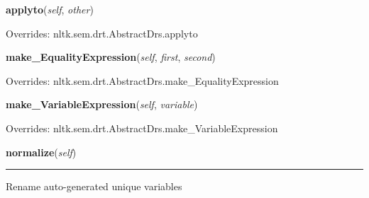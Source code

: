 \hspace{.8\funcindent}\begin{boxedminipage}{\funcwidth}

    \raggedright \textbf{applyto}(\textit{self}, \textit{other})

\setlength{\parskip}{2ex}
\setlength{\parskip}{1ex}
      Overrides: nltk.sem.drt.AbstractDrs.applyto

    \end{boxedminipage}

    \vspace{0.5ex}

\hspace{.8\funcindent}\begin{boxedminipage}{\funcwidth}

    \raggedright \textbf{make\_EqualityExpression}(\textit{self}, \textit{first}, \textit{second})

\setlength{\parskip}{2ex}
\setlength{\parskip}{1ex}
      Overrides: nltk.sem.drt.AbstractDrs.make\_EqualityExpression

    \end{boxedminipage}

    \vspace{0.5ex}

\hspace{.8\funcindent}\begin{boxedminipage}{\funcwidth}

    \raggedright \textbf{make\_VariableExpression}(\textit{self}, \textit{variable})

\setlength{\parskip}{2ex}
\setlength{\parskip}{1ex}
      Overrides: nltk.sem.drt.AbstractDrs.make\_VariableExpression

    \end{boxedminipage}

    \label{temporaldrt:AbstractDrs:normalize}

    \vspace{0.5ex}

\hspace{.8\funcindent}\begin{boxedminipage}{\funcwidth}

    \raggedright \textbf{normalize}(\textit{self})

    \vspace{-1.5ex}

    \rule{\textwidth}{0.5\fboxrule}
\setlength{\parskip}{2ex}
    Rename auto-generated unique variables

\setlength{\parskip}{1ex}
    \end{boxedminipage}


